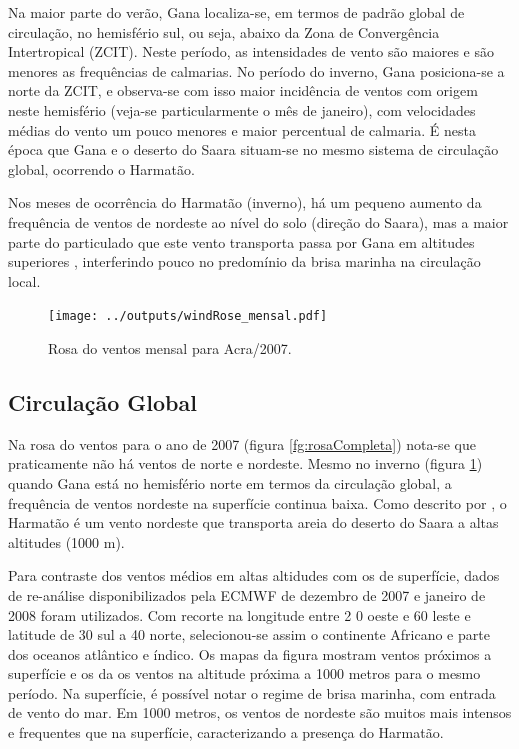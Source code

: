 Na maior parte do verão, Gana localiza-se, em termos de padrão global de 
circulação, no hemisfério sul, ou seja, abaixo da Zona de Convergência 
Intertropical (ZCIT). Neste período, as intensidades de vento são maiores e 
são menores as frequências de calmarias. No período do inverno, Gana 
posiciona-se a norte da ZCIT, e observa-se com isso maior incidência de 
ventos com origem neste hemisfério (veja-se particularmente o mês 
de janeiro), 
com velocidades médias do vento um pouco menores e maior percentual
de calmaria. É nesta época que Gana e o deserto do Saara situam-se no mesmo 
sistema de circulação global, ocorrendo o Harmatão. 

Nos meses de ocorrência do Harmatão (inverno), há um pequeno aumento da 
frequência de ventos de nordeste ao nível do solo (direção do Saara), mas a 
maior parte do particulado que este vento transporta passa por Gana em 
altitudes superiores \citep{breuning2005}, interferindo pouco no predomínio 
da brisa marinha na circulação local.%

\newpage
\begin{figure}[H]
  \centering
  \texttt{[image: ../outputs/windRose\_mensal.pdf]}
  \caption{Rosa do ventos mensal para Acra/2007. \label{fig:windRose_mensal}}
\end{figure}

\newpage
\subsection{Circulação Global}

Na rosa do ventos para o ano de 2007 (figura \ref{fg:rosaCompleta}) nota-se 
que praticamente não há ventos de norte e nordeste. Mesmo no inverno 
(figura \ref{fig:windRose_mensal}) quando Gana está no hemisfério norte em 
termos da circulação global, a frequência de ventos nordeste na superfície 
continua baixa. 
Como descrito por \citet{breuning2005}, o Harmatão é um vento nordeste 
que transporta areia do deserto do Saara a altas altitudes (1000 m).

Para contraste dos ventos médios em altas altidudes com os de superfície, 
dados de re-análise disponibilizados pela ECMWF de dezembro de 
2007 e janeiro de 2008 foram utilizados. Com recorte na longitude entre 2
0 oeste e 60 leste e latitude de 30 sul a 40 norte, selecionou-se assim o 
continente Africano e parte dos oceanos atlântico e índico. 
Os mapas da figura \label{fig:ECMWF10} mostram
ventos próximos a superfície e os da \label{fig:ECMWF1000} os ventos na altitude 
próxima a 1000 metros para o mesmo período. 
Na superfície, é possível notar o regime de brisa marinha, com entrada de vento 
do mar. Em 1000 metros, os ventos de nordeste são muitos mais intensos e 
frequentes que na superfície, caracterizando a presença do Harmatão. 

